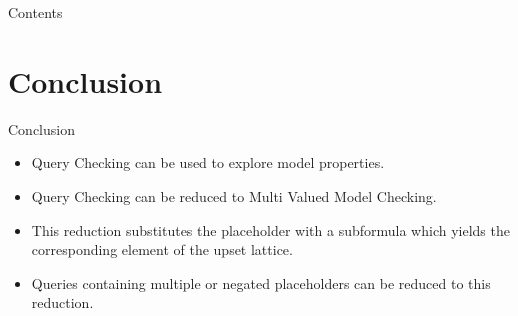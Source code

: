 

\frame{\titlepage}

\begin{frame}{Contents}
  \tableofcontents
\end{frame}







\section*{Conclusion}
\begin{frame}{Conclusion}
  \begin{itemize}
    \item Query Checking can be used to \alert{explore model properties}.
    \item Query Checking can be reduced to \alert{Multi Valued Model Checking}.
    \item This reduction \alert{substitutes} the placeholder with a subformula which 
    \alert{yields the corresponding element} of the upset lattice.
    \item Queries containing \alert{multiple or negated} placeholders can be reduced 
    to this reduction.
  \end{itemize}
\end{frame}






%  
%  


